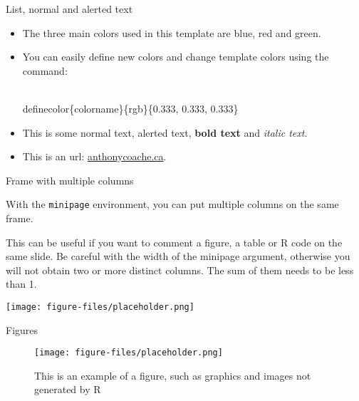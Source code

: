 \documentclass[aspectratio=43]{beamer}
\begin{document}
\begin{frame}[fragile]{List, normal and alerted text}

\begin{itemize}
\setlength{\itemsep}{15pt}
\item The three main colors used in this template are \textcolor{mblue}{blue}, \textcolor{mred}{red} and \textcolor{mgreen}{green}. \\
\item You can easily define new colors and change template colors using the command: \begin{semiverbatim}\\definecolor\{colorname\}\{rgb\}\{0.333, 0.333, 0.333\}\end{semiverbatim}
\item This is some normal text, \alert{alerted text}, \textbf{bold text} and \textit{italic text}. \\
\item This is an url: \href{http://www.anthonycoache.ca}{anthonycoache.ca}.
\end{itemize}

\end{frame}


\begin{frame}{Frame with multiple columns}

\begin{minipage}[t]{0.3\linewidth}
	
	With the \texttt{minipage} environment, you can put multiple columns on the same frame.
	
\end{minipage}
\hfill
\begin{minipage}[t]{0.66\linewidth}
	
	This can be useful if you want to comment a figure, a table or R code on the same slide. Be careful with the width of the minipage argument, otherwise you will not obtain two or more distinct columns. The sum of them needs to be less than 1.
	
	\vspace*{0.25cm}
	
	\centerline{\texttt{[image: figure-files/placeholder.png]}}
	
	
\end{minipage}

\end{frame}


\begin{frame}{Figures}

\begin{figure}
\caption{This is an example of a figure, such as graphics and images not generated by R}
\centerline{\texttt{[image: figure-files/placeholder.png]}}
\end{figure}

\end{frame}
\end{document}
